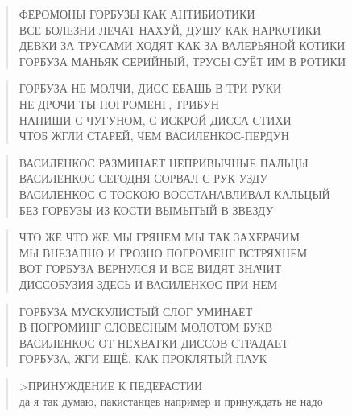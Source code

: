 \poemtitle{***}
\begin{verse}
ФЕРОМОНЫ ГОРБУЗЫ КАК АНТИБИОТИКИ\\
ВСЕ БОЛЕЗНИ ЛЕЧАТ НАХУЙ, ДУШУ КАК НАРКОТИКИ\\
ДЕВКИ ЗА ТРУСАМИ ХОДЯТ КАК ЗА ВАЛЕРЬЯНОЙ КОТИКИ\\
ГОРБУЗА МАНЬЯК СЕРИЙНЫЙ, ТРУСЫ СУЁТ ИМ В РОТИКИ
\end{verse}

\poemtitle{***}
\begin{verse}
ГОРБУЗА НЕ МОЛЧИ, ДИСС ЕБАШЬ В ТРИ РУКИ\\
НЕ ДРОЧИ ТЫ ПОГРОМЕНГ, ТРИБУН\\
НАПИШИ С ЧУГУНОМ, С ИСКРОЙ ДИССА СТИХИ\\
ЧТОБ ЖГЛИ СТАРЕЙ, ЧЕМ ВАСИЛЕНКОС-ПЕРДУН
\end{verse}

\poemtitle{***}
\begin{verse}
ВАСИЛЕНКОС РАЗМИНАЕТ НЕПРИВЫЧНЫЕ ПАЛЬЦЫ\\
ВАСИЛЕНКОС СЕГОДНЯ СОРВАЛ С РУК УЗДУ\\
ВАСИЛЕНКОС С ТОСКОЮ ВОССТАНАВЛИВАЛ КАЛЬЦЫЙ\\
БЕЗ ГОРБУЗЫ ИЗ КОСТИ ВЫМЫТЫЙ В ЗВЕЗДУ
\end{verse}

\poemtitle{***}
\begin{verse}
ЧТО ЖЕ ЧТО ЖЕ МЫ ГРЯНЕМ МЫ ТАК ЗАХЕРАЧИМ\\
МЫ ВНЕЗАПНО И ГРОЗНО ПОГРОМЕНГ ВСТРЯХНЕМ\\
ВОТ ГОРБУЗА ВЕРНУЛСЯ И ВСЕ ВИДЯТ ЗНАЧИТ\\
ДИССОБУЗИЯ ЗДЕСЬ И ВАСИЛЕНКОС ПРИ НЕМ
\end{verse}

\poemtitle{***}
\begin{verse}
ГОРБУЗА МУСКУЛИСТЫЙ СЛОГ УМИНАЕТ\\
В ПОГРОМИНГ СЛОВЕСНЫМ МОЛОТОМ БУКВ\\
ВАСИЛЕНКОС ОТ НЕХВАТКИ ДИССОВ СТРАДАЕТ\\
ГОРБУЗА, ЖГИ ЕЩЁ, КАК ПРОКЛЯТЫЙ ПАУК
\end{verse}

\poemtitle{***}
\begin{verse}
>ПРИНУЖДЕНИЕ К ПЕДЕРАСТИИ\\
да я так думаю, пакистанцев например и принуждать не надо
\end{verse}


